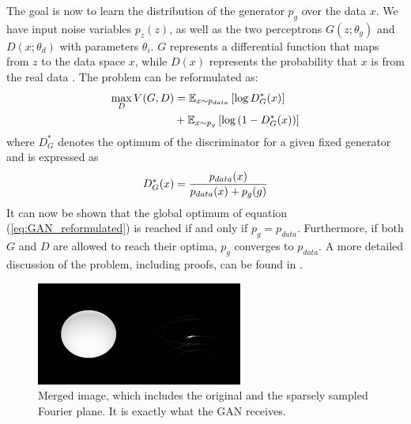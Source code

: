 The goal is now to learn the distribution of the generator $p_g$ over the data $x$. We have input noise variables $p_z(z)$, as well as the two perceptrons $G(z; \theta_g)$ and $D(x; \theta_d)$ with parameters $\theta_i$. $G$ represents a differential function that maps from $z$ to the data space $x$, while $D(x)$ represents the probability that $x$ is from the real data \citep{goodfellow2014generative}. The problem can be reformulated as: 
\begin{equation}
	\centering
	\begin{aligned}
		\max_{D} V(G, D) &= \mathbb{E}_{x \sim p_{data}} \left[ \log D^{*}_{G}(x) \right] \\ 
		&+ \mathbb{E}_{x \sim p_{g}} \left[ \log \left( 1 - D^{*}_{G}(x) \right) \right]
	\end{aligned}
	\label{eq:GAN_reformulated}
\end{equation}
where $D^{*}_{G}$ denotes the optimum of the discriminator for a given fixed generator and is expressed as
\begin{equation}
	\centering
	D^*_G(x) = \frac{p_{data}(x)}{p_{data}(x) + p_g(g)}
	\label{eq:Disc_optimum}
\end{equation}
It can now be shown that the global optimum of equation (\ref{eq:GAN_reformulated}) is reached if and only if $p_g = p_{data}$. Furthermore, if both $G$ and $D$ are allowed to reach their optima, $p_g$ converges to $p_{data}$. A more detailed discussion of the problem, including proofs, can be found in \citep{goodfellow2014generative}.
\begin{figure}
	\centering
	\includegraphics[width=\linewidth]{fig/ellipsoid_0.jpg}
	\caption{Merged image, which includes the original and the sparsely sampled Fourier plane. It is exactly what the GAN receives. }
	\label{fig:GANinput}
\end{figure}
